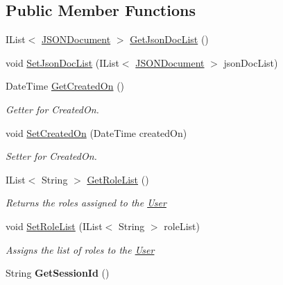 \subsection*{Public Member Functions}
\begin{DoxyCompactItemize}
\item 
I\+List$<$ \hyperlink{classcom_1_1shephertz_1_1app42_1_1paas_1_1sdk_1_1csharp_1_1user_1_1_user_1_1_j_s_o_n_document}{J\+S\+O\+N\+Document} $>$ \hyperlink{classcom_1_1shephertz_1_1app42_1_1paas_1_1sdk_1_1csharp_1_1user_1_1_user_ad90e4b70b9507a96fc576cb9e0b402ff}{Get\+Json\+Doc\+List} ()
\item 
void \hyperlink{classcom_1_1shephertz_1_1app42_1_1paas_1_1sdk_1_1csharp_1_1user_1_1_user_adbfe53e8c9368aad197e6c2b97b0c1e8}{Set\+Json\+Doc\+List} (I\+List$<$ \hyperlink{classcom_1_1shephertz_1_1app42_1_1paas_1_1sdk_1_1csharp_1_1user_1_1_user_1_1_j_s_o_n_document}{J\+S\+O\+N\+Document} $>$ json\+Doc\+List)
\item 
Date\+Time \hyperlink{classcom_1_1shephertz_1_1app42_1_1paas_1_1sdk_1_1csharp_1_1user_1_1_user_adbacef30333757f20f793cfb5effafde}{Get\+Created\+On} ()
\begin{DoxyCompactList}\small\item\em Getter for Created\+On. \end{DoxyCompactList}\item 
void \hyperlink{classcom_1_1shephertz_1_1app42_1_1paas_1_1sdk_1_1csharp_1_1user_1_1_user_afc2b629517c3d798d73578cbe018c311}{Set\+Created\+On} (Date\+Time created\+On)
\begin{DoxyCompactList}\small\item\em Setter for Created\+On. \end{DoxyCompactList}\item 
I\+List$<$ String $>$ \hyperlink{classcom_1_1shephertz_1_1app42_1_1paas_1_1sdk_1_1csharp_1_1user_1_1_user_a763fe4f69456d6b939ce37a4e705f05e}{Get\+Role\+List} ()
\begin{DoxyCompactList}\small\item\em Returns the roles assigned to the \hyperlink{classcom_1_1shephertz_1_1app42_1_1paas_1_1sdk_1_1csharp_1_1user_1_1_user}{User} \end{DoxyCompactList}\item 
void \hyperlink{classcom_1_1shephertz_1_1app42_1_1paas_1_1sdk_1_1csharp_1_1user_1_1_user_ac438875b4d553cc84799d09dd0f6c713}{Set\+Role\+List} (I\+List$<$ String $>$ role\+List)
\begin{DoxyCompactList}\small\item\em Assigns the list of roles to the \hyperlink{classcom_1_1shephertz_1_1app42_1_1paas_1_1sdk_1_1csharp_1_1user_1_1_user}{User} \end{DoxyCompactList}\item 
\hypertarget{classcom_1_1shephertz_1_1app42_1_1paas_1_1sdk_1_1csharp_1_1user_1_1_user_a0f8c61cc954195a8e15fe28e92fc0562}{String {\bfseries Get\+Session\+Id} ()}\label{classcom_1_1shephertz_1_1app42_1_1paas_1_1sdk_1_1csharp_1_1user_1_1_user_a0f8c61cc954195a8e15fe28e92fc0562}


\end{DoxyCompactItemize}
